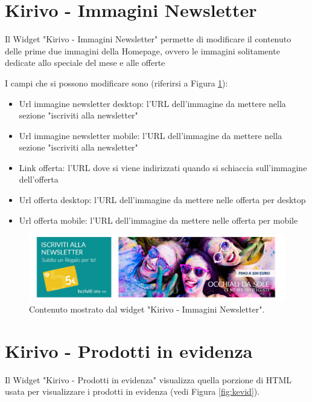 
\newpage
\section{Kirivo - Immagini Newsletter}

Il Widget "Kirivo - Immagini Newsletter" permette di modificare il contenuto
delle prime due immagini della Homepage, ovvero le immagini solitamente dedicate
allo speciale del mese e alle offerte 

I campi che si possono modificare sono (riferirsi a Figura \ref{fig:knews}):
\begin{itemize}
\item Url immagine newsletter desktop: l'URL dell'immagine da mettere nella sezione "iscriviti alla newsletter"
\item Url immagine newsletter mobile: l'URL dell'immagine da mettere nella sezione "iscriviti alla newsletter"
\item Link offerta: l'URL dove si viene indirizzati quando si schiaccia sull'immagine dell'offerta
\item Url offerta desktop: l'URL dell'immagine da mettere nelle offerta per desktop
\item Url offerta mobile: l'URL dell'immagine da mettere nelle offerta per mobile
\end{itemize}

\begin{figure}
  \includegraphics[width=\textwidth]{figure/knews.png}
  \caption{Contenuto mostrato dal widget "Kirivo - Immagini Newsletter".}
  \label{fig:knews}
\end{figure}


\newpage
\section{Kirivo - Prodotti in evidenza}

Il Widget "Kirivo - Prodotti in evidenza" visualizza quella porzione di HTML usata
per visualizzare i prodotti in evidenza (vedi Figura \ref{fig:kevid}).


